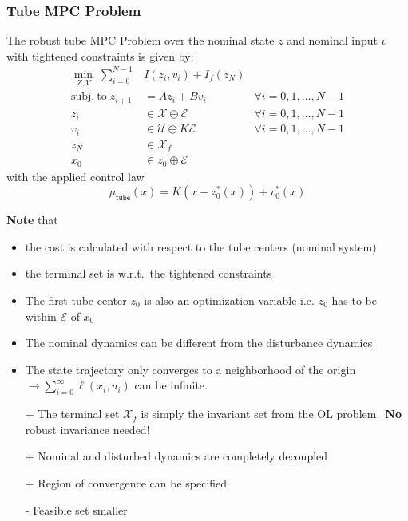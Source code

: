 \subsubsection{Tube MPC Problem}
The robust tube MPC Problem over the nominal state $z$ and nominal input $v$ with tightened constraints is given by:
\begin{align*}
    \min_{Z,V}\;\sum_{i=0}^{N-1} & I(z_{i},v_{i})+I_{f}(z_{N})                                      \\
    \mathrm{subj.~to }\; z_{i+1} & =Az_{i}+Bv_{i}                     & \forall i=0, 1, \ldots, N-1 \\
    z_{i}                        & \in\mathcal{X}\ominus\mathcal{E}   & \forall i=0, 1, \ldots, N-1 \\
    v_i                          & \in\mathcal{U}\ominus K\mathcal{E} & \forall i=0, 1, \ldots, N-1 \\
    z_N                          & \in \mathcal{X}_f                                                \\
    x_0                          & \in z_0 \oplus \mathcal{E}
\end{align*}
with the applied control law
\begin{equation*}
    \mu_{\mathsf{tube}}(x) = K(x - z_0^*(x)) + v_0^*(x)
\end{equation*}

\textbf{Note} that
\begin{itemize}
    \item the cost is calculated with respect to the tube centers (nominal system)
    \item the terminal set is w.r.t.\ the tightened constraints
    \item The first tube center $z_0$ is also an optimization variable i.e. $z_0$ has to be within $\mathcal{E}$ of $x_0$
    \item The nominal dynamics can be different from the disturbance dynamics
    \item The state trajectory only converges to a neighborhood of the origin $\to \sum_{i=0}^\infty \ell(x_i,u_i)$ can be infinite.
\end{itemize}

\newpar{}

\begin{itemize}
    \item [+] The terminal set $\mathcal{X}_f$ is simply the invariant set from the OL problem.~\textbf{No} robust invariance needed!
    \item [+] Nominal and disturbed dynamics are completely decoupled
    \item [+] Region of convergence can be specified        %
    \item [-] Feasible set smaller  %
\end{itemize}

